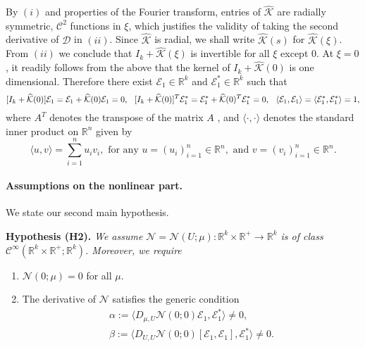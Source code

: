 \documentclass[letterpaper,11pt]{article}
\newcommand{\R}{\mathbb{R}}
\newcommand{\Nl}{\mathcal{N}}
\newcommand{\K}{\mathcal{K}}
\numberwithin{equation}{section}
\newenvironment{Hypothesis}[1]%
  {\begin{trivlist}\item[]{\bf Hypothesis #1 }\em}{\end{trivlist}}
\theoremstyle{plain}
\theoremstyle{remark}
\begin{document}
By $(i)$ and properties of the Fourier transform, entries of $\widehat{\K}$ are radially symmetric, $\mathscr{C}^2$ functions in $\xi$, which justifies the validity of taking the second derivative of $\mathcal{D}$ in $(ii)$. Since $\widehat{\K}$ is radial, we shall write $\widehat{\K}(s)$ for $\widehat{\K}(\xi)$. From $(ii)$ we conclude that $I_k+\widehat{\K}(\xi)$ is invertible for all $\xi$ except $0$. At $\xi = 0$, it readily follows from the above that the kernel of $I_k + \widehat{\K}(0)$ is one dimensional. Therefore there exist $\mathcal{E}_1\in \R^k$ and $\mathcal{E}_1^* \in \R^k$ such that
\[
[I_k+\widehat{\K}(0)]\mathcal{E}_1 = \mathcal{E}_1+\widehat{\K}(0) \mathcal{E}_1 = 0,  \hspace{0.1in} [I_k+\widehat{\K}(0)]^T\mathcal{E}_1^* = \mathcal{E}_1^*+\widehat{\K}(0)^T \mathcal{E}_1^* =0, \hspace{0.1in} \langle \mathcal{E}_1, \mathcal{E}_1 \rangle = \langle \mathcal{E}_1^*, \mathcal{E}_1^*\rangle=1,
\]
where $A^T$ denotes the transpose of the matrix $A$ , and $\langle \cdot,\cdot \rangle$ denotes the standard inner product on $\R^n$ given by
\[
\langle u,v\rangle = \sum_{i=1}^{n} u_iv_i, \text{ for any }u=(u_i)_{i=1}^n\in \R^n, \text{ and }v=(v_i)_{i=1}^n \in \R^n.
\]

\paragraph{Assumptions on the nonlinear part.}

We state our second main hypothesis.
\begin{Hypothesis} {(H2).} We assume $\Nl=\Nl(U;\mu):\R^k \times \R^+ \to \R^k $ is of class  $\mathscr{C}^{\infty}(\R^k \times \R^+; \R^k)$. Moreover, we require
\begin{enumerate}
\item $\Nl(0;\mu) = 0$ for all $\mu$.

\item The derivative of $\Nl$ satisfies the generic condition 
\begin{eqnarray}
\alpha := \langle D_{\mu,U} \Nl(0;0)\mathcal{E}_1, \mathcal{E}_1^*\rangle \neq 0
 \label{muvCoe}, \\ 
\beta := \langle D_{U,U} \Nl(0;0)[\mathcal{E}_1,\mathcal{E}_1], \mathcal{E}_1^*\rangle \neq 0  \label{QuadCoe}.
\end{eqnarray}


\end{enumerate}

\end{Hypothesis}
\end{document}
